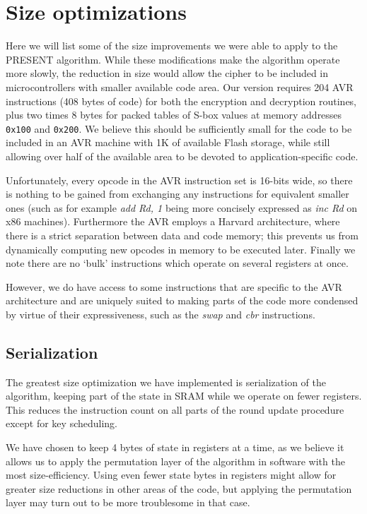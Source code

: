 \documentclass[11pt]{article}
\begin{document}
\section{Size optimizations}

Here we will list some of the size improvements we were able to apply to the PRESENT algorithm.
While these modifications make the algorithm operate more slowly, the reduction in size would allow the cipher to be included in microcontrollers with smaller available code area.
Our version requires 204 AVR instructions (408 bytes of code) for both the encryption and decryption routines, plus two times 8 bytes for packed tables of S-box values at memory addresses \texttt{0x100} and \texttt{0x200}.
We believe this should be sufficiently small for the code to be included in an AVR machine with 1K of available Flash storage, while still allowing over half of the available area to be devoted to application-specific code.

Unfortunately, every opcode in the AVR instruction set is 16-bits wide, so there is nothing to be gained from exchanging any instructions for equivalent smaller ones (such as for example \textit{add Rd, 1} being more concisely expressed as \textit{inc Rd} on x86 machines).
Furthermore the AVR employs a Harvard architecture, where there is a strict separation between data and code memory; this prevents us from dynamically computing new opcodes in memory to be executed later.
Finally we note there are no `bulk' instructions which operate on several registers at once.

However, we do have access to some instructions that are specific to the AVR architecture and are uniquely suited to making parts of the code more condensed by virtue of their expressiveness, such as the \textit{swap} and \textit{cbr} instructions.

\subsection{Serialization}
The greatest size optimization we have implemented is serialization of the algorithm, keeping part of the state in SRAM while we operate on fewer registers.
This reduces the instruction count on all parts of the round update procedure except for key scheduling.

We have chosen to keep 4 bytes of state in registers at a time, as we believe it allows us to apply the permutation layer of the algorithm in software with the most size-efficiency.
Using even fewer state bytes in registers might allow for greater size reductions in other areas of the code, but applying the permutation layer may turn out to be more troublesome in that case.
\end{document}

